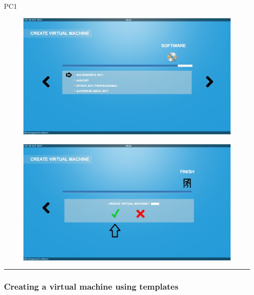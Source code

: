 \begin{lyxlist}{PC1}
\begin{figure}[H]
\centering
\includegraphics[width=170mm]{images/createVMEx9.eps}
\caption{\label{overflow}}
\end{figure}

\begin{figure}[H]
\centering
\includegraphics[width=170mm]{images/createVMEx10.eps}
\caption{\label{overflow}}
\end{figure}

\end{lyxlist}
\hrule
\vspace{0.5cm}





\subsubsection{Creating a virtual machine using templates}

